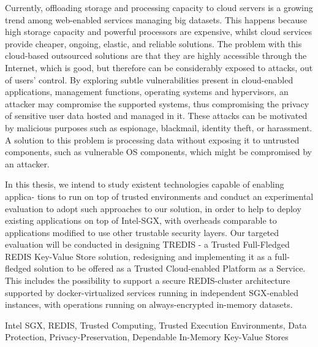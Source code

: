 
Currently, offloading storage and processing capacity to cloud servers is a growing
trend among web-enabled services managing big datasets. This happens because high
storage capacity and powerful processors are expensive, whilst cloud services provide
cheaper, ongoing, elastic, and reliable solutions. The problem with this cloud-based outsourced solutions are that they are highly accessible through the Internet, which is good,
but therefore can be considerably exposed to attacks, out of users’ control. By exploring
subtle vulnerabilities present in cloud-enabled applications, management functions, operating systems and hypervisors, an attacker may compromise the supported systems,
thus compromising the privacy of sensitive user data hosted and managed in it. These
attacks can be motivated by malicious purposes such as espionage, blackmail, identity
theft, or harassment. A solution to this problem is processing data without exposing it to
untrusted components, such as vulnerable OS components, which might be compromised
by an attacker.

In this thesis, we intend to study existent technologies capable of enabling applica-
tions to run on top of trusted environments and conduct an experimental evaluation to
adopt such approaches to our solution, in order to help to deploy existing applications
on top of Intel-SGX, with overheads comparable to applications modified to use other
trustable security layers. Our targeted evaluation will be conducted in designing TREDIS
- a Trusted Full-Fledged REDIS Key-Value Store solution, redesigning and implementing it as a full-fledged solution to be offered as a Trusted Cloud-enabled Platform as
a Service. This includes the possibility to support a secure REDIS-cluster architecture
supported by docker-virtualized services running in independent SGX-enabled instances,
with operations running on always-encrypted in-memory datasets.

\begin{keywords}
Intel SGX, REDIS, Trusted Computing, Trusted Execution Environments, Data Protection, Privacy-Preservation, Dependable In-Memory Key-Value Stores
\end{keywords} 



